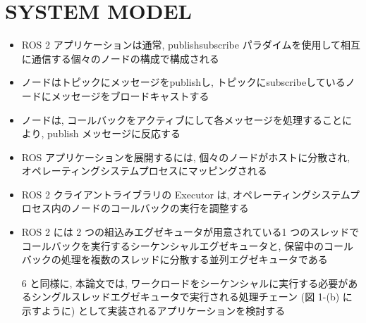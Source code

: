 
\section{SYSTEM MODEL}
\label{sec: system model}

\begin{frame}{}
\end{frame}

\begin{frame}{}
    \begin{itemize}
        \item ROS 2 アプリケーションは通常, publishsubscribe パラダイムを使用して相互に通信する個々のノードの構成で構成される
        \item ノードはトピックにメッセージをpublishし, トピックにsubscribeしているノードにメッセージをブロードキャストする
        \item ノードは, コールバックをアクティブにして各メッセージを処理することにより, publish メッセージに反応する
        \item ROS アプリケーションを展開するには, 個々のノードがホストに分散され, オペレーティングシステムプロセスにマッピングされる
    \end{itemize}
\end{frame}

\begin{frame}{}
    \begin{itemize}
        \item ROS 2 クライアントライブラリの Executor は, オペレーティングシステムプロセス内のノードのコールバックの実行を調整する
        \item ROS 2 には 2 つの組込みエグゼキュータが用意されている1 つのスレッドでコールバックを実行するシーケンシャルエグゼキュータと, 保留中のコールバックの処理を複数のスレッドに分散する並列エグゼキュータである
        \item [6] と同様に, 本論文では, ワークロードをシーケンシャルに実行する必要があるシングルスレッドエグゼキュータで実行される処理チェーン (図 1-(b) に示すように) として実装されるアプリケーションを検討する
    \end{itemize}
\end{frame}


